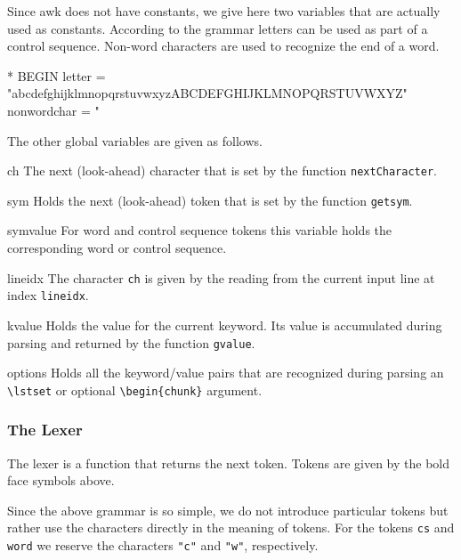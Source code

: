 \documentclass[a4paper]{article} %
\newcommand{\packagename}[1]{{\normalfont\sffamily#1}}
\newenvironment{ttdescription}
  {\list{}{\labelwidth0pt \itemindent-\leftmargin
      \def\makelabel##1{\hspace\labelsep
        \normalfont\ttfamily ##1:}}}
  {\endlist}
\begin{document}
Since \packagename{awk} does not have constants, we give here two
variables that are actually used as constants. According to the
grammar letters can be used as part of a control sequence. Non-word
characters are used to recognize the end of a word.
\begin{chunk}{*}
BEGIN {
  letter      = "abcdefghijklmnopqrstuvwxyzABCDEFGHIJKLMNOPQRSTUVWXYZ"
  nonwordchar = " %
}
\end{chunk}

The other global variables are given as follows.
\begin{ttdescription}
\item[ch] The next (look-ahead) character that is set by the function
  \texttt{nextCharacter}.

\item[sym] Holds the next (look-ahead) token that is set by the
  function \texttt{getsym}.

\item[symvalue] For word and control sequence tokens this variable
  holds the corresponding word or control sequence.

\item[lineidx] The character \texttt{ch} is given by the reading from
  the current input line at index \texttt{lineidx}.

\item[kvalue] Holds the value for the current keyword. Its value is
  accumulated during parsing and returned by the function
  \texttt{gvalue}.

\item[options] Holds all the keyword/value pairs that are recognized
  during parsing an \verb'\'\verb'lstset' or optional
  \verb'\'\verb'begin{chunk}' argument.

\end{ttdescription}


\subsubsection{The Lexer}
The lexer is a function that returns the next token. Tokens are given
by the bold face symbols above.

Since the above grammar is so simple, we do not introduce particular
tokens but rather use the characters directly in the meaning of
tokens. For the tokens \texttt{cs} and \texttt{word} we reserve the
characters \texttt{"c"} and \texttt{"w"}, respectively.
\end{document}
